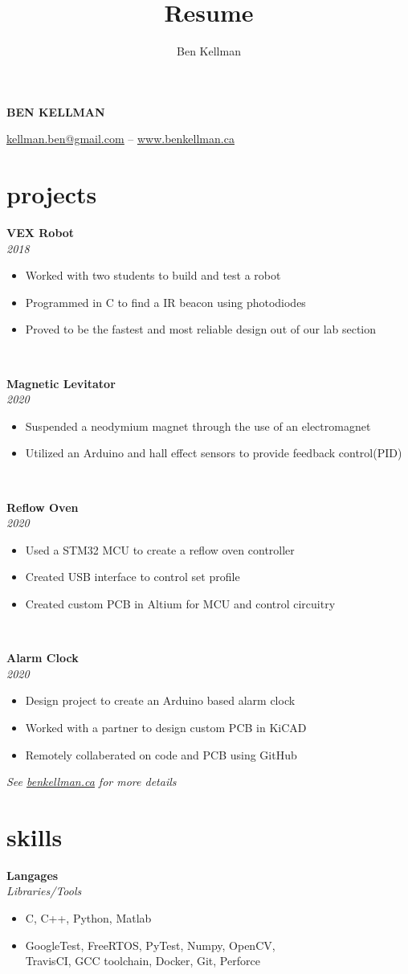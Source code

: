 \documentclass{article}
\author{Ben Kellman}
\title{Resume}
\newcommand{\grayhline}{
  \noindent\makebox[\linewidth]{\textcolor{gray}{\rule{0.95\textwidth}{1pt}}}\\
}
\newcommand{\minicolumns}[2]{
  \begin{minipage}[t]{0.25\textwidth}
    \begin{flushright}
      #1
    \end{flushright}
  \end{minipage}
  \hfill
  \begin{minipage}[t]{0.7\textwidth}
    #2
  \end{minipage}
}
\newcommand{\resumeSection}[3]{
  \minicolumns{
      \textbf{#1}\\
      \textit{#2}
    }
    {
      \begin{itemize}[leftmargin=*]
          \justifying
          \setlength\itemsep{-0.1em}
          #3
      \end{itemize}
  }
  \vspace{0.5\baselineskip}
}
\begin{document}
\begin{center}
  \textbf{\LARGE{\MakeUppercase{Ben Kellman}}}

  \vspace{0.75em}
  \underline{\href{mailto: kellman.ben@gmail.com}{kellman.ben@gmail.com}} -- \underline{\href{www.BenKellman.ca}{www.benkellman.ca}}

\end{center}
\vspace{1em}

\begin{minipage}[t]{0.65\textwidth}
  \section{projects}
  \resumeSection{VEX Robot}{2018}{
      \item Worked with two students to build and test a robot
      \item Programmed in C to find a IR beacon using photodiodes
      \item Proved to be the fastest and most reliable design out of our lab section
  }

  \grayhline
  \resumeSection{Magnetic Levitator}{2020}{
      \item Suspended a neodymium magnet through the use of an electromagnet
      \item Utilized an Arduino and hall effect sensors to provide feedback control(PID)
  }

  \grayhline
  \resumeSection{Reflow Oven}{2020}{
      \item Used a STM32 MCU to create a reflow oven controller
      \item Created USB interface to control set profile
      \item Created custom PCB in Altium for MCU and control circuitry
  }

  \grayhline
  \resumeSection{Alarm Clock}{2020}{
      \item Design project to create an Arduino based alarm clock
      \item Worked with a partner to design custom PCB in KiCAD
      \item Remotely collaberated on code and PCB using GitHub
  }

  \textit{See \underline{\href{www.benkellman.ca}{benkellman.ca}} for more details}

  \section{skills}
  \resumeSection{Langages}{Libraries/Tools}{
    \item C, C++, Python, Matlab
    \item GoogleTest, FreeRTOS, PyTest, Numpy, OpenCV,\\ TravisCI, GCC toolchain, Docker, Git, Perforce
  }


\end{minipage}
\end{document}
